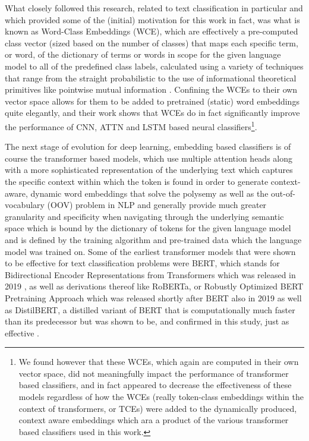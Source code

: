 \documentclass[final]{clv2025}
\begin{document}
What closely followed this research, related to text classification in particular and which provided some of the (initial) motivation for this work in fact, was what is known as Word-Class Embeddings (WCE), which are effectively a pre-computed class vector (sized based on the number of classes) that maps each specific term, or word, of the dictionary of terms or words in scope for the given language model to all of the predefined class labels, calculated using a variety of techniques that range from the straight probabilistic to the use of informational theoretical primitives like pointwise mutual information \cite{moreo}. Confining the WCEs to their own vector space allows for them to be added to pretrained (static) word embeddings quite elegantly, and their work shows that WCEs do in fact significantly improve the performance of CNN, ATTN and LSTM based neural classifiers\footnote{We found however that these WCEs, which again are computed in their own vector space, did not meaningfully impact the performance of transformer based classifiers, and in fact appeared to decrease the effectiveness of these models regardless of how the WCEs (really token-class embeddings within the context of transformers, or TCEs) were added to the dynamically produced, context aware embeddings which ara a product of the various transformer based classifiers used in this work.}.  

The next stage of evolution for deep learning, embedding based classifiers is of course the transformer based models, which use multiple attention heads along with a more sophisticated representation of the underlying text which captures the specific context within which the token is found in order to generate context-aware, dynamic word embeddings that solve the polysemy as well as the out-of-vocabulary (OOV) problem in NLP and generally provide much greater granularity and specificity when navigating through the underlying semantic space which is bound by the dictionary of tokens for the given language model and is defined by the training algorithm and pre-trained data which the language model was trained on.  Some of the earliest transformer models that were shown to be effective for text classification problems were BERT, which stands for Bidirectional Encoder Representations from Transformers which was released in 2019 \cite{devlin-etal-2019-bert}, as well as derivations thereof like RoBERTa, or Robustly Optimized BERT Pretraining Approach which was released shortly after BERT also in 2019 \cite{liu2019roberta} as well as DistilBERT, a distilled  \cite{hinton2015distilling} variant of BERT that is computationally much faster than its predecessor but was shown to be, and confirmed in this study, just as effective \cite{sanh2020distilbert}. 
\end{document}
